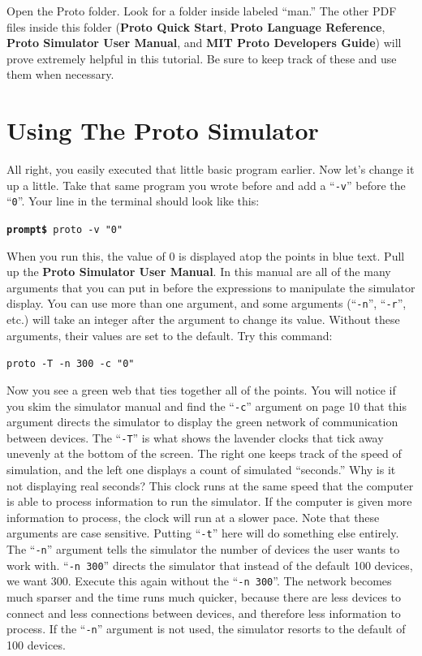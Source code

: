 \documentclass{article}
\newcommand\code[1]{\begin{center}\var{#1}\end{center}}
\newcommand\var[1]{{\tt #1}}
\newcommand\qvar[1]{``{\tt #1}''}
\newcommand\lesson[1]{\fbox{\parbox[c]{\textwidth}{Key Concepts:
      #1}}\vspace{\baselineskip}}
\begin{document}
Open the Proto folder.  Look for a folder inside labeled ``man.''  The
other PDF files inside this folder ({\bf Proto Quick Start}, {\bf
  Proto Language Reference}, {\bf Proto Simulator User Manual}, and
{\bf MIT Proto Developers Guide}) will prove extremely helpful in this
tutorial.  Be sure to keep track of these and use them when necessary.


\section{Using The Proto Simulator}

All right, you easily executed that little basic program earlier.  Now
let's change it up a little.  Take that same program you wrote before
and add a \qvar{-v} before the \qvar{0}.  Your line in the terminal should
look like this:

\code{{\bf prompt\$} proto -v "0"}

When you run this, the value of 0 is displayed atop the points in blue
text.  Pull up the {\bf Proto Simulator User Manual}. In this manual
are all of the many arguments that you can put in before the
expressions to manipulate the simulator display.  You can use more
than one argument, and some arguments (\qvar{-n}, \qvar{-r}, etc.) will
take an integer after the argument to change its value.  Without these
arguments, their values are set to the default.  Try this command:

\code{proto -T -n 300 -c "0"}

Now you see a green web that ties together all of the points. You will
notice if you skim the simulator manual and find the \qvar{-c}
argument on page 10 that this argument directs the simulator to
display the green network of communication between devices.  The
\qvar{-T} is what shows the lavender clocks that tick away unevenly at
the bottom of the screen.  The right one keeps track of the speed of
simulation, and the left one displays a count of simulated
``seconds.''  Why is it not displaying real seconds?  This clock runs
at the same speed that the computer is able to process information to
run the simulator.  If the computer is given more information to
process, the clock will run at a slower pace.  Note that these
arguments are case sensitive.  Putting \qvar{-t} here will do
something else entirely.  The \qvar{-n} argument tells the simulator
the number of devices the user wants to work with. \qvar{-n 300}
directs the simulator that instead of the default 100 devices, we want
300.  Execute this again without the \qvar{-n 300}.  The network
becomes much sparser and the time runs much quicker, because there are
less devices to connect and less connections between devices, and
therefore less information to process.  If the \qvar{-n} argument is
not used, the simulator resorts to the default of 100 devices.
\end{document}

